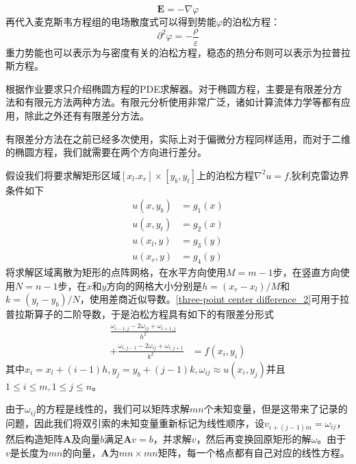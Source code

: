 \documentclass[UTF8,a4paper,10pt]{ctexart}
\begin{document}
\begin{multicols}{2}
            \begin{equation}
                \bm{E} = -\nabla\varphi
            \end{equation}
            再代入麦克斯韦方程组的电场散度式可以得到势能$\varphi$的泊松方程：
            \begin{equation}
                \partial^2\varphi = -\frac{\rho}{\varepsilon}
            \end{equation}
            重力势能也可以表示为与密度有关的泊松方程，稳态的热分布则可以表示为拉普拉斯方程。\par
            根据作业要求只介绍椭圆方程的PDE求解器。对于椭圆方程，主要是有限差分方法和有限元方法两种方法。有限元分析使用非常广泛，诸如计算流体力学等都有应用，除此之外还有有限差分方法。\par
            有限差分方法在之前已经多次使用，实际上对于偏微分方程同样适用，而对于二维的椭圆方程，我们就需要在两个方向进行差分。\par
            假设我们将要求解矩形区域$[x_l.x_r]\times[y_b,y_t]$上的泊松方程$\nabla^2u=f$,狄利克雷边界条件如下
            \begin{equation*}
                \begin{split}
                    u(x,y_b) &= g_1(x)\\
                    u(x,y_t) &= g_2(x)\\
                    u(x_l,y) &= g_3(y)\\
                    u(x_r,y) &= g_4(y)
                \end{split}
            \end{equation*}
            将求解区域离散为矩形的点阵网格，在水平方向使用$M = m-1$步，在竖直方向使用$N = n-1$步，在$x$和$y$方向的网格大小分别是$h=(x_r-x_l)/M$和$k=(y_t-y_b)/N$，使用差商近似导数。\eqref{three-point center difference_2}可用于拉普拉斯算子的二阶导数，于是泊松方程具有如下的有限差分形式
            \begin{equation}
                \begin{split}
                    \frac{\omega_{i-1,j}-2\omega_{ij}+\omega_{i+1,j}}{h^2}&\\
                    +\frac{\omega_{i,j-1}-2\omega_{ij}+\omega_{i,j+1}}{k^2} &= f(x_i,y_i)                   
                \end{split}
            \end{equation}
            其中$x_i=x_l+(i-1)h,y_j=y_b+(j-1)k,\omega_{ij}\approx u(x_i,y_j)$并且$1\le i\le m,1\le j\le n$。\par
            由于$\omega_{ij}$的方程是线性的，我们可以矩阵求解$mn$个未知变量，但是这带来了记录的问题，因此我们将双引索的未知变量重新标记为线性顺序，设$v_{i+(j-1)m} = \omega_{ij}$，然后构造矩阵$\bm{A}$及向量$b$满足$\bm{A}v=b$，并求解$v$，然后再变换回原矩形的解$\omega$。由于$v$是长度为$mn$的向量，$\bm{A}$为$mn\times mn$矩阵，每一个格点都有自己对应的线性方程。\par

\end{multicols}
\end{document}
